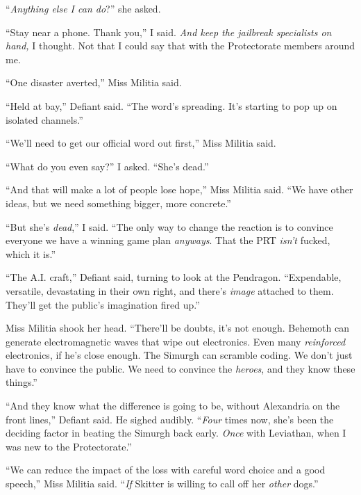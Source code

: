``\emph{Anything else I can do}?'' she asked.



``Stay near a phone.  Thank you,'' I said.  \emph{And keep the jailbreak specialists on hand, }I thought.  Not that I could say that with the Protectorate members around me.



``One disaster averted,'' Miss Militia said.



``Held at bay,'' Defiant said.  ``The word's spreading.  It's starting to pop up on isolated channels.''



``We'll need to get our official word out first,'' Miss Militia said.



``What do you even say?'' I asked.  ``She's dead.''



``And that will make a lot of people lose hope,'' Miss Militia said.  ``We have other ideas, but we need something bigger, more concrete.''



``But she's \emph{dead},'' I said.  ``The only way to change the reaction is to convince everyone we have a winning game plan \emph{anyways}.  That the PRT \emph{isn't} fucked, which it is.''



``The A.I. craft,'' Defiant said, turning to look at the Pendragon.  ``Expendable, versatile, devastating in their own right, and there's \emph{image} attached to them.  They'll get the public's imagination fired up.''



Miss Militia shook her head.  ``There'll be doubts, it's not enough.  Behemoth can generate electromagnetic waves that wipe out electronics.  Even many \emph{reinforced} electronics, if he's close enough.  The Simurgh can scramble coding.  We don't just have to convince the public.  We need to convince the \emph{heroes}, and they know these things.''



``And they know what the difference is going to be, without Alexandria on the front lines,'' Defiant said.  He sighed audibly.  ``\emph{Four} times now, she's been the deciding factor in beating the Simurgh back early.  \emph{Once} with Leviathan, when I was new to the Protectorate.''



``We can reduce the impact of the loss with careful word choice and a good speech,'' Miss Militia said.  ``\emph{If} Skitter is willing to call off her \emph{other} dogs.''



